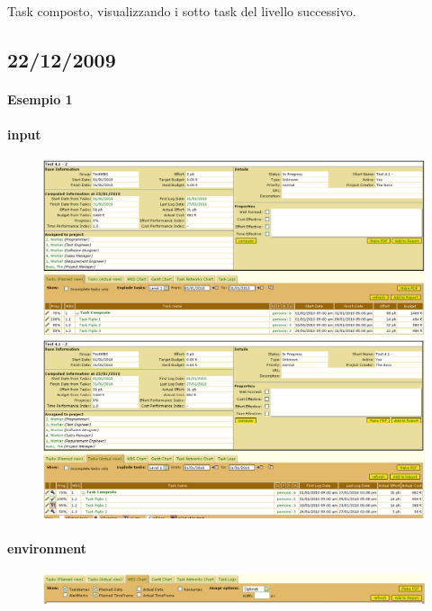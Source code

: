 Task composto, visualizzando i sotto task del livello successivo.

\subsection{22/12/2009}
\paragraph{Esempio 1}
\paragraph{input}
\begin{figure}
\centering
\includegraphics[width=\textwidth]{tests/TEST_WBS/4.1/4.1_2/Esempio_1/input.png}
\includegraphics[width=\textwidth]{tests/TEST_WBS/4.1/4.1_2/Esempio_1/input_actual.png}
\end{figure}
\paragraph{environment}
\begin{figure}
\centering
\includegraphics[width=\textwidth]{tests/TEST_WBS/4.1/4.1_2/Esempio_1/environment.png}
\end{figure}
